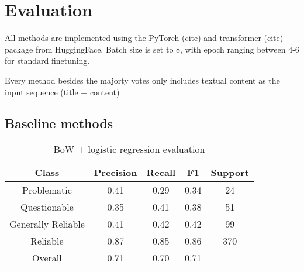 \chapter{Evaluation}
\label{cha:6}


All methods are implemented using the PyTorch (cite) and transformer (cite) package from HuggingFace. Batch size is set to 8, with epoch ranging between 4-6 for standard finetuning.

Every method besides the majorty votes only includes textual content as the input sequence (title + content)


\section{Baseline methods}

\begin{table}[!h]
    \centering
    \begin{minipage}[t]{\linewidth}
        \centering
        \begin{tabular}{|| c | c | c | c | c ||}
            \hline
            Class              & Precision & Recall & F1   & Support \\
            \hline
            \hline
            Problematic        & 0.41      & 0.29   & 0.34 & 24      \\
            \hline
            Questionable       & 0.35      & 0.41   & 0.38 & 51      \\
            \hline
            Generally Reliable & 0.41      & 0.42   & 0.42 & 99      \\
            \hline
            Reliable           & 0.87      & 0.85   & 0.86 & 370     \\
            \hline
            Overall            & 0.71      & 0.70   & 0.71 &         \\
            \hline
        \end{tabular}
        \caption{BoW + logistic regression evaluation}
        \label{table:bow_logistic}
    \end{minipage}
\end{table}


